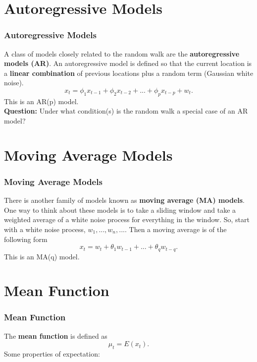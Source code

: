 \documentclass[%
xcolor=pdftex]{beamer}
\begin{document}
\section{Autoregressive Models}
\frame{\tableofcontents[currentsection]}

\begin{frame}
\frametitle{Autoregressive Models}

A class of models closely related to the random walk are the
\textbf{autoregressive  models (AR)}.  An autoregressive model is defined so that the
current location is a \textbf{linear combination} of previous locations
plus a random term (Gaussian white noise).
\begin{equation}\label{eq:AR}
x_t=\phi_1 x_{t-1} + \phi_2 x_{t-2}+...+ \phi_p x_{t-p}+w_t.
\end{equation}
This is an AR(p) model. \\
\vspace{5mm}
\textbf{Question:} Under what condition(s) is the random walk a special case of an AR model?

\end{frame}

\section{Moving Average Models}
\frame{\tableofcontents[currentsection]}

\begin{frame}
\frametitle{Moving Average Models}

There is another family of models known as \textbf{moving average
(MA) models}. One way to think about these models is to take a
sliding window and take a weighted average of a white noise
process for everything in the window.  So, start with a white
noise process, $w_1,...,w_n, ...$.  Then a moving average is of
the following form
\begin{equation}\label{eq:MA}
x_t=w_t +\theta_1 w_{t-1}+...+\theta_q w_{t-q}.
\end{equation}
This is an MA(q) model.

\end{frame}

\section{Mean Function}
\frame{\tableofcontents[currentsection]}

\begin{frame}
\frametitle{Mean Function}

The \textbf{mean function} is defined as
\begin{equation}
\mu_t=E(x_t).
\end{equation}
Some properties of expectation:
\vspace{40mm}

\end{frame}
\end{document}
